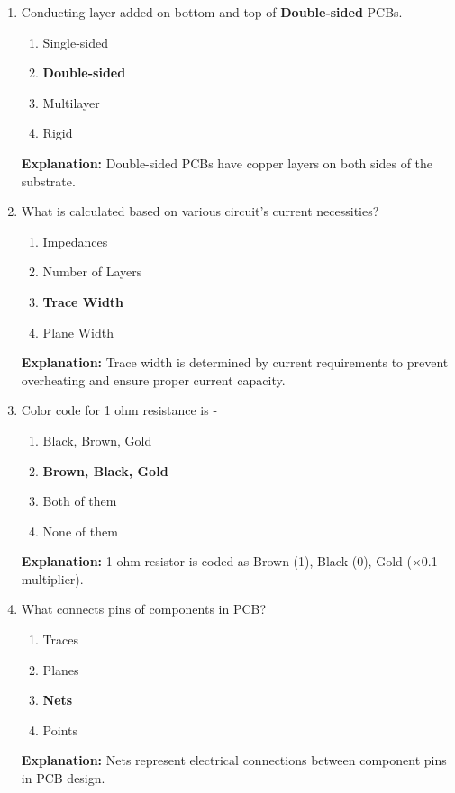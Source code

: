 \documentclass[a4paper,12pt]{article}
\begin{document}
\begin{enumerate}
		\item Conducting layer added on bottom and top of \textbf{Double-sided} PCBs.
		\begin{enumerate}
			\item Single-sided
			\item \textbf{Double-sided}
			\item Multilayer
			\item Rigid
		\end{enumerate}
		\textbf{Explanation:} Double-sided PCBs have copper layers on both sides of the substrate.
		
		\item What is calculated based on various circuit's current necessities?
		\begin{enumerate}
			\item Impedances
			\item Number of Layers
			\item \textbf{Trace Width}
			\item Plane Width
		\end{enumerate}
		\textbf{Explanation:} Trace width is determined by current requirements to prevent overheating and ensure proper current capacity.
		
		\item Color code for 1 ohm resistance is -
		\begin{enumerate}
			\item Black, Brown, Gold
			\item \textbf{Brown, Black, Gold}
			\item Both of them
			\item None of them
		\end{enumerate}
		\textbf{Explanation:} 1 ohm resistor is coded as Brown (1), Black (0), Gold (×0.1 multiplier).
		
		\item What connects pins of components in PCB?
		\begin{enumerate}
			\item Traces
			\item Planes
			\item \textbf{Nets}
			\item Points
		\end{enumerate}
		\textbf{Explanation:} Nets represent electrical connections between component pins in PCB design.
	\end{enumerate}
	
\end{document}
